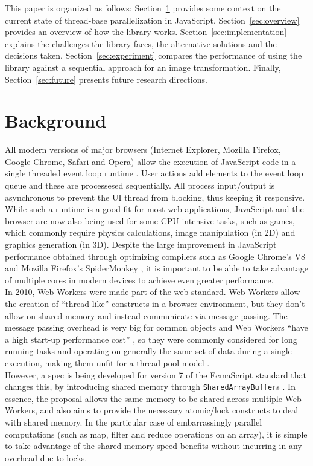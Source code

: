 \documentclass[runningheads,a4paper]{llncs}
\begin{document}
This paper is organized as follows: Section~\ref{sec:background} provides some context on the current state of thread-base parallelization in JavaScript. Section~\ref{sec:overview} provides an overview of how the library works. Section~\ref{sec:implementation} explains the challenges the library faces, the alternative solutions and the decisions taken. Section~\ref{sec:experiment} compares the performance of using the library against a sequential approach for an image transformation. Finally, Section~\ref{sec:future} presents future research directions.

\section{Background}\label{sec:background}
All modern versions of major browsers (Internet Explorer, Mozilla Firefox, Google Chrome, Safari and Opera) allow the execution of JavaScript code in a single threaded event loop runtime \cite{event-loop}. User actions add elements to the event loop queue and these are processesed sequentially. All process input/output is asynchronous to prevent the UI thread from blocking, thus keeping it responsive.
While such a runtime is a good fit for most web applications, JavaScript and the browser are now also being used for some CPU intensive tasks, such as games, which commonly require physics calculations, image manipulation (in 2D) and graphics generation (in 3D). Despite the large improvement in JavaScript performance obtained through optimizing compilers such as Google Chrome's V8 \cite{v8} and Mozilla Firefox's SpiderMonkey \cite{spider-monkey}, it is important to be able to take advantage of multiple cores in modern devices to achieve even greater performance.\\
In 2010, Web Workers were made part of the web standard. Web Workers allow the creation of ``thread like'' constructs in a browser environment, but they don't allow on shared memory and instead communicate via message passing. The message passing overhead is very big for common objects and Web Workers ``have a high start-up performance cost'' \cite{w3c-ww}, so they were commonly considered for long running tasks and operating on generally the same set of data during a single execution, making them unfit for a thread pool  model \cite{thread-pool}.\\
However, a spec is being developed for version 7 of the EcmaScript standard that changes this, by introducing shared memory through \verb+SharedArrayBuffer+s \cite{sab}. In essence, the proposal allows the same memory to be shared across multiple Web Workers, and also aims to provide the necessary atomic/lock constructs to deal with shared memory. In the particular case of embarrassingly parallel computations (such as map, filter and reduce operations on an array), it is simple to take advantage of the shared memory speed benefits without incurring in any overhead due to locks.
\end{document}
